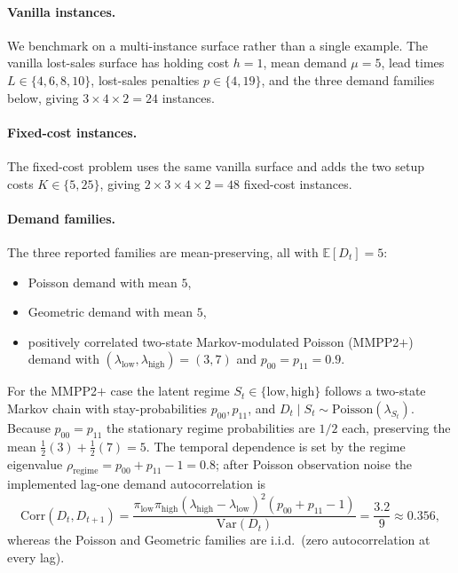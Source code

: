 \documentclass[11pt]{article}
\begin{document}
\paragraph{Vanilla instances.}
We benchmark on a multi-instance surface rather than a single example. The vanilla lost-sales
surface has holding cost $h=1$, mean demand $\mu=5$, lead times $L\in\{4,6,8,10\}$, lost-sales
penalties $p\in\{4,19\}$, and the three demand families below, giving $3\times4\times2=24$
instances.

\paragraph{Fixed-cost instances.}
The fixed-cost problem uses the same vanilla surface and adds the two setup costs
$K\in\{5,25\}$, giving $2\times3\times4\times2=48$ fixed-cost instances.

\paragraph{Demand families.}
The three reported families are mean-preserving, all with $\mathbb{E}[D_t]=5$:
\begin{itemize}
    \item Poisson demand with mean $5$,
    \item Geometric demand with mean $5$,
    \item positively correlated two-state Markov-modulated Poisson (MMPP2$+$) demand with
    $(\lambda_{\mathrm{low}},\lambda_{\mathrm{high}})=(3,7)$ and $p_{00}=p_{11}=0.9$.
\end{itemize}
For the MMPP2$+$ case the latent regime $S_t\in\{\mathrm{low},\mathrm{high}\}$ follows a two-state
Markov chain with stay-probabilities $p_{00},p_{11}$, and $D_t\mid S_t\sim
\mathrm{Poisson}(\lambda_{S_t})$. Because $p_{00}=p_{11}$ the stationary regime probabilities are
$1/2$ each, preserving the mean $\tfrac12(3)+\tfrac12(7)=5$. The temporal dependence is set by the
regime eigenvalue $\rho_{\mathrm{regime}}=p_{00}+p_{11}-1=0.8$; after Poisson observation noise
the implemented lag-one demand autocorrelation is
\[
\mathrm{Corr}(D_t,D_{t+1})
=\frac{\pi_{\mathrm{low}}\pi_{\mathrm{high}}(\lambda_{\mathrm{high}}-\lambda_{\mathrm{low}})^2
(p_{00}+p_{11}-1)}{\mathrm{Var}(D_t)}=\frac{3.2}{9}\approx0.356,
\]
whereas the Poisson and Geometric families are i.i.d.\ (zero autocorrelation at every lag).
\end{document}

